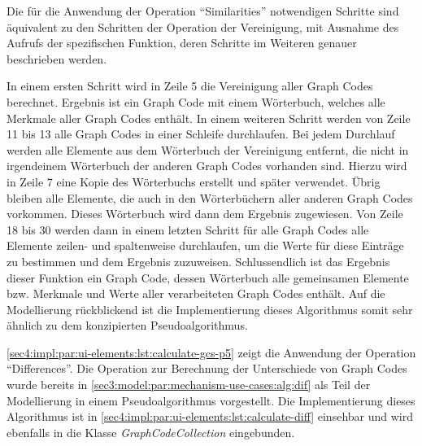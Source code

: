 



Die für die Anwendung der Operation \enquote{Similarities} notwendigen Schritte sind äquivalent zu den Schritten der Operation der Vereinigung, mit Ausnahme des Aufrufs der spezifischen Funktion, deren Schritte im Weiteren genauer beschrieben werden.

In einem ersten Schritt wird in Zeile 5 die Vereinigung aller Graph Codes berechnet.
Ergebnis ist ein Graph Code mit einem Wörterbuch, welches alle Merkmale aller Graph Codes enthält.
In einem weiteren Schritt werden von Zeile 11 bis 13 alle Graph Codes in einer Schleife durchlaufen.
Bei jedem Durchlauf werden alle Elemente aus dem Wörterbuch der Vereinigung entfernt, die nicht in irgendeinem Wörterbuch der anderen Graph Codes vorhanden sind.
Hierzu wird in Zeile 7 eine Kopie des Wörterbuchs erstellt und später verwendet.
Übrig bleiben alle Elemente, die auch in den Wörterbüchern aller anderen Graph Codes vorkommen.
Dieses Wörterbuch wird dann dem Ergebnis zugewiesen.
Von Zeile 18 bis 30 werden dann in einem letzten Schritt für alle Graph Codes alle Elemente zeilen- und spaltenweise durchlaufen, um die Werte für diese Einträge zu bestimmen und dem Ergebnis zuzuweisen.
Schlussendlich ist das Ergebnis dieser Funktion ein Graph Code, dessen Wörterbuch alle gemeinsamen Elemente bzw. Merkmale und Werte aller verarbeiteten Graph Codes enthält.
Auf die Modellierung rückblickend ist die Implementierung dieses Algorithmus somit sehr ähnlich zu dem konzipierten Pseudoalgorithmus.

\cref{sec4:impl:par:ui-elements:lst:calculate-gcs-p5} zeigt die Anwendung der Operation \enquote{Differences}.
Die Operation zur Berechnung der Unterschiede von Graph Codes wurde bereits in \cref{sec3:model:par:mechanism-use-cases:alg:dif} als Teil der Modellierung in einem Pseudoalgorithmus vorgestellt.
Die Implementierung dieses Algorithmus ist in \cref{sec4:impl:par:ui-elements:lst:calculate-diff} einsehbar und wird ebenfalls in die Klasse \textit{GraphCodeCollection} eingebunden.



